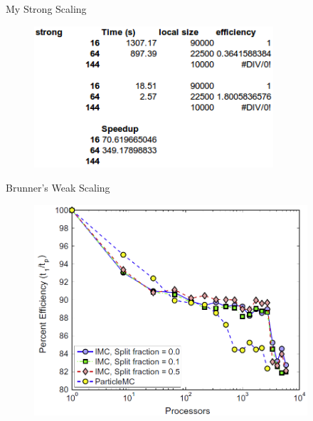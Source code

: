 \documentclass{beamer}
\begin{document}
\begin{frame}{My Strong Scaling}

  \begin{figure}[h!]
    \begin{center}
      \includegraphics[width=3.5in]{my_strong.png}
    \end{center}
  \end{figure}

\end{frame}

\begin{frame}{Brunner's Weak Scaling}

  \begin{figure}[h!]
    \begin{center}
      \includegraphics[width=4in]{brunner_weak.png}
    \end{center}
  \end{figure}

\end{frame}
\end{document}
